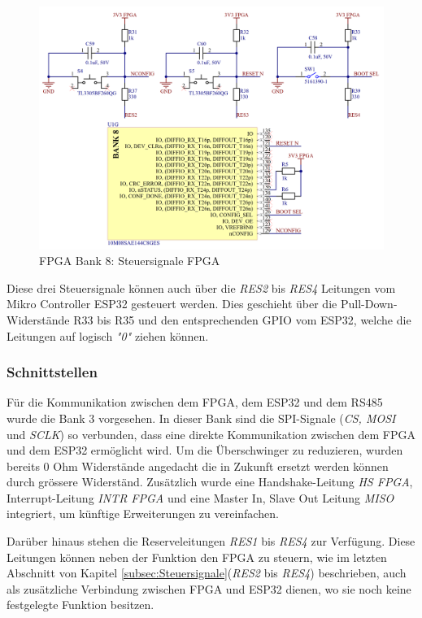 \begin{figure}[H]
    \centering
    \includegraphics[width=1.0\linewidth]{Figures/Chap3/Schematics/Bank8_Admin.png}
    \caption{FPGA Bank 8: Steuersignale FPGA}
    \label{FPGA Admin}
\end{figure}

Diese drei Steuersignale können auch über die \textit{RES2} bis \textit{RES4} Leitungen vom Mikro Controller ESP32 gesteuert werden. Dies geschieht über die Pull-Down-Widerstände R33 bis R35 und den entsprechenden GPIO vom ESP32, welche die Leitungen auf logisch \textit{"0"} ziehen können.

\subsubsection{Schnittstellen}
\label{subsubsec:Schnittstellen}
Für die Kommunikation zwischen dem FPGA, dem ESP32 und dem RS485 wurde die Bank 3 vorgesehen. In dieser Bank sind die SPI-Signale (\textit{CS, MOSI} und \textit{SCLK}) so verbunden, dass eine direkte Kommunikation zwischen dem FPGA und dem ESP32 ermöglicht wird. Um die Überschwinger zu reduzieren, wurden bereits 0 Ohm Widerstände angedacht die in Zukunft ersetzt werden können durch grössere Widerständ. Zusätzlich wurde eine Handshake-Leitung \textit{HS FPGA}, Interrupt-Leitung \textit{INTR FPGA} und eine Master In, Slave Out Leitung \textit{MISO} integriert, um künftige Erweiterungen zu vereinfachen.

Darüber hinaus stehen die Reserveleitungen \textit{RES1} bis \textit{RES4} zur Verfügung. Diese Leitungen können neben der Funktion den FPGA zu steuern, wie im letzten Abschnitt von Kapitel \ref{subsec:Steuersignale}(\textit{RES2} bis \textit{RES4}) beschrieben, auch als zusätzliche Verbindung zwischen FPGA und ESP32 dienen, wo sie noch keine festgelegte Funktion besitzen.

